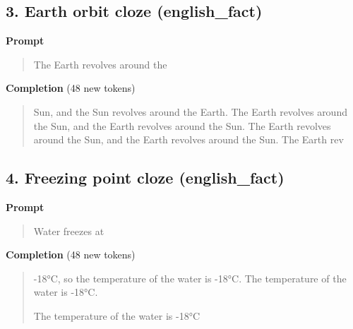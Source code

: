 \documentclass[10pt,a4paper]{article}
\begin{document}
\subsection*{3. Earth orbit cloze (english\_fact)}
\textbf{Prompt}\par
\begin{quote}\small\raggedright  The Earth revolves around the\par\end{quote}
\textbf{Completion} (48 new tokens)\par
\begin{quote}\small\raggedright  \hspace*{0.5em}Sun, and the Sun revolves around the Earth. The Earth revolves around the Sun, and the Earth revolves around the Sun. The Earth revolves around the Sun, and the Earth revolves around the Sun. The Earth rev\par\end{quote}
\filbreak
\subsection*{4. Freezing point cloze (english\_fact)}
\textbf{Prompt}\par
\begin{quote}\small\raggedright  Water freezes at\par\end{quote}
\textbf{Completion} (48 new tokens)\par
\begin{quote}\small\raggedright  \hspace*{0.5em}-18°C, so the temperature of the water is -18°C. The temperature of the water is -18°C.\par\noindent \mbox{}\par\noindent The temperature of the water is -18°C\par\end{quote}
\filbreak
\end{document}
